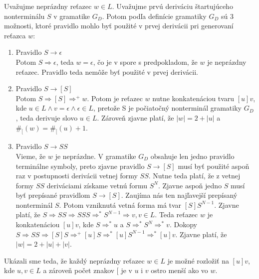 \documentclass[10pt]{article}
\begin{document}
Uvažujme neprázdny reťazec $w \in L$. Uvažujme prvú deriváciu štartujúceho nonterminálu $S$ v
gramatike $G_D$. Potom podľa definície gramatiky $G_D$ sú 3 možnosti, ktoré pravidlo mohlo byť
použité v prvej derivácii pri generovaní reťazca $w$:
\begin{enumerate}
    \item Pravidlo $S \to \epsilon$\\
        Potom $S \Rightarrow \epsilon$, teda $w = \epsilon$, čo je v spore s predpokladom, že
        $w$ je neprázdny reťazec. Pravidlo teda nemôže byť použité v prvej derivácii.
    \item Pravidlo $S \to [S]$\\
        Potom $S \Rightarrow [S] \Rightarrow^+ w$. Potom je reťazec $w$ nutne konkatenáciou
        tvaru $[u]v$, kde $u \in L \land v = \epsilon \land \epsilon \in L$, pretože S je počiatočný nonterminál gramatiky $G_D$, teda derivuje
        slovo $u \in L$. Zároveň zjavne platí, že $|w| =  2+|u|$ a $\#_[(w) = \#_[(u) + 1$. 
    \item Pravidlo $S \to SS$\\
        Vieme, že $w$ je neprázdne. V gramatike $G_D$ obsahuje len jedno pravidlo terminálne symboly,
        preto zjavne pravidlo $S \to [S]$ musí byť použité aspoň raz v postupnosti derivácii vetnej
        formy $SS$. Nutne teda platí, že z vetnej formy $SS$ deriváciami získame vetnú formu $S^N$.
        Zjavne aspoň jedno $S$ musí byť prepísané pravidlom $S \to [S]$. Zaujíma nás ten najľavejší
        prepísaný nonterminál $S$. Potom vzniknutá vetná forma má tvar $[S]S^{N-1}$. Zjavne platí, že
        $S \Rightarrow SS \Rightarrow SSS \Rightarrow^* S^{N-1} \Rightarrow v, v \in L$. Teda reťazec $w$
        je konkatenáciou $[u]v$, kde $S\Rightarrow^*u$ a $S \Rightarrow^* S^N \Rightarrow^* v$.
        Dokopy $S \Rightarrow SS \Rightarrow [S]S \Rightarrow^+ [u]S \Rightarrow^* [u]S^{N-1} \Rightarrow^* [u]v$. Zjavne platí, že
        $|w| = 2 + |u|+|v|$.
\end{enumerate}
Ukázali sme teda, že každý neprázdny reťazec $w \in L$ je možné rozložiť na $[u]v$, kde $u,v \in L$ a zároveň počet znakov $[$ je v $u$ i $v$ ostro menší ako vo $w$.
\end{document}
